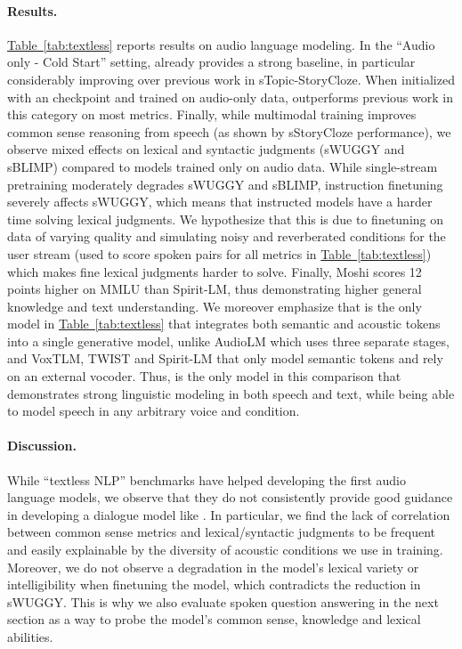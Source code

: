 \paragraph{Results.} \hyperref[tab:textless]{Table~\ref{tab:textless}} reports results on audio language modeling. In the ``Audio only - Cold Start'' setting, \ours{} already provides a strong baseline, in particular considerably improving over previous work in sTopic-StoryCloze.  When initialized with an \helium{} checkpoint and trained on audio-only data, \ours{} outperforms previous work in this category on most metrics. Finally, while multimodal training improves common sense reasoning from speech (as shown by sStoryCloze performance), we observe mixed effects on lexical and syntactic judgments (sWUGGY and sBLIMP) compared to models trained only on audio data. While single-stream pretraining moderately degrades sWUGGY and sBLIMP, instruction finetuning severely affects sWUGGY, which means that instructed models have a harder time solving lexical judgments. 
We hypothesize that this is due to finetuning \ours{} on data of varying quality and simulating noisy and reverberated conditions for the user stream (used to score spoken pairs for all metrics in \hyperref[tab:textless]{Table~\ref{tab:textless}}) which makes fine lexical judgments harder to solve. Finally, Moshi scores 12 points higher on MMLU than Spirit-LM, thus demonstrating higher general knowledge and text understanding. We moreover emphasize that \ours{} is the only model in \hyperref[tab:textless]{Table~\ref{tab:textless}} that integrates both semantic and acoustic tokens into a single generative model, unlike AudioLM which uses three separate stages, and VoxTLM, TWIST and Spirit-LM that only model semantic tokens and rely on an external vocoder. Thus, \ours{} is the only model in this comparison that demonstrates strong linguistic modeling in both speech and text, while being able to model speech in any arbitrary voice and condition.

\paragraph{Discussion.}
While ``textless NLP'' benchmarks have helped developing the first audio language models, we observe that they do not consistently provide good guidance in developing a dialogue model like \ours{}. In particular, we find the lack of correlation between common sense metrics and lexical/syntactic judgments to be frequent and easily explainable by the diversity of acoustic conditions we use in training. Moreover, we do not observe a degradation in the model's lexical variety or intelligibility when finetuning the model, which contradicts the reduction in sWUGGY. This is why we also evaluate spoken question answering in the next section as a way to probe the model's common sense, knowledge and lexical abilities.

